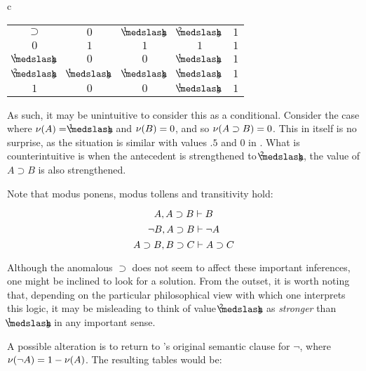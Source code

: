 \begin{singlespace}
\begin{longtable}{ c }
	\begin{tabular}{c | c c c c}
		$\supset$ 		& $ 0  $			& $ \oneThird $ & $ \twoThirds $ & $ 1  $ \\
		\cline{1-5} 
		$ 0  $ 			& $ 1  $ 			& $ 1  $ 		& $ 1 $			& $ 1 $ \\
		$ \oneThird $ 	& $ 0  $ 			& $ 0  $ 		& $ \oneThird $	& $ 1  $ \\
		$ \twoThirds $	& $ \oneThird  $	& $ \oneThird $ & $ \oneThird $	& $ 1  $ \\
		$ 1  $ 			& $ 0  $ 			& $ 0  $ 		& $ \oneThird $	& $ 1  $ \\
	\end{tabular}
\end{longtable}
\end{singlespace}
\noindent As such, it may be unintuitive to consider this as a conditional. Consider the case where $\Val{A} = \oneThird$ and $\mathcal{\nu}({B}) = 0$, and so $\mathcal{\nu}({A \supset B}) = 0$. This in itself is no surprise, as the situation is similar with values $.5$ and $0$ in \GO. What is counterintuitive is when the antecedent is strengthened to $\twoThirds$, the value of $A \supset B$ is also strengthened. 

Note that modus ponens, modus tollens and transitivity hold:

\[{A, A\supset B}\vdash{B}\]
\[{\neg B, A\supset B}\vdash{\neg A}\]
\[{A\supset B, B\supset C}\vdash{A\supset C}\]
	
\noindent Although the anomalous $\supset$ does not seem to affect these important inferences, one might be inclined to look for a solution. From the outset, it is worth noting that, depending on the particular philosophical view with which one interprets this logic, it may be misleading to think of value $\twoThirds$ as \emph{stronger} than $\oneThird$ in any important sense. 

A possible alteration is to return to \GO's original semantic clause for $\neg$, where $\mathcal{\nu}({\neg A}) = 1 - \mathcal{\nu}({A})$. The resulting tables would be:

